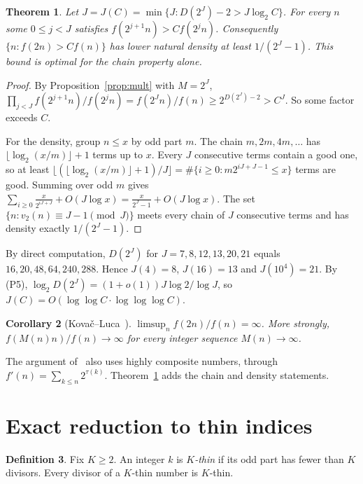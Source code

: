 \documentclass[11pt]{amsart}
\newtheorem{theorem}{Theorem}[section]
\newtheorem{corollary}[theorem]{Corollary}
\theoremstyle{definition}
\newtheorem{definition}[theorem]{Definition}
\theoremstyle{remark}
\begin{document}
\begin{theorem}\label{thm:density}
Let $J=J(C)=\min\{J:D(2^J)-2>J\log_2C\}$. For every $n$ some $0\le j<J$ satisfies $f(2^{j+1}n)>Cf(2^jn)$.
Consequently $\{n:f(2n)>Cf(n)\}$ has lower natural density at least $1/(2^J-1)$. This bound is optimal for the chain
property alone.
\end{theorem}
\begin{proof}
By Proposition~\ref{prop:mult} with $M=2^J$, $\prod_{j<J}f(2^{j+1}n)/f(2^jn)=f(2^Jn)/f(n)\ge2^{D(2^J)-2}>C^J$.
So some factor exceeds $C$.

For the density, group $n\le x$ by odd part $m$. The chain $m,2m,4m,\dots$ has
$\lfloor\log_2(x/m)\rfloor+1$ terms up to $x$. Every $J$ consecutive terms contain a good one, so at least
$\lfloor(\lfloor\log_2(x/m)\rfloor+1)/J\rfloor=\#\{i\ge0:m2^{iJ+J-1}\le x\}$ terms are good. Summing over odd $m$ gives
$\sum_{i\ge0}\frac{x}{2^{iJ+J}}+O(J\log x)=\frac{x}{2^J-1}+O(J\log x)$.
The set $\{n:v_2(n)\equiv J-1\pmod J\}$ meets every chain of $J$ consecutive terms and has density exactly
$1/(2^J-1)$.
\end{proof}

By direct computation, $D(2^J)$ for $J=7,8,12,13,20,21$ equals $16,20,48,64,240,288$. Hence $J(4)=8$, $J(16)=13$ and
$J(10^4)=21$. By (P5), $\log_2D(2^J)=(1+o(1))J\log2/\log J$, so $J(C)=O(\log\log C\cdot\log\log\log C)$.

\begin{corollary}[Kova\v{c}--Luca~\cite{KL}]\label{cor:KL}
$\limsup_nf(2n)/f(n)=\infty$. More strongly, $f(M(n)n)/f(n)\to\infty$ for every integer sequence $M(n)\to\infty$.
\end{corollary}

The argument of~\cite{KL} also uses highly composite numbers, through $f'(n)=\sum_{k\le n}2^{\tau(k)}$.
Theorem~\ref{thm:density} adds the chain and density statements.

\section{Exact reduction to thin indices}

\begin{definition}
Fix $K\ge2$. An integer $k$ is \emph{$K$-thin} if its odd part has fewer than $K$ divisors. Every divisor of a
$K$-thin number is $K$-thin.
\end{definition}
\end{document}
